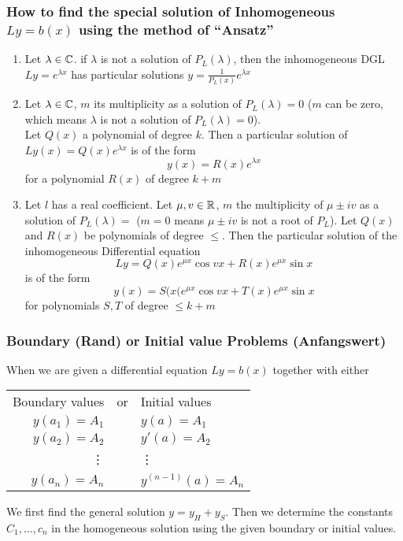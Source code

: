 \documentclass[a4paper]{article}
\begin{document}
\subsubsection*{How to find the special solution of Inhomogeneous $Ly=b(x)$ using the method of ``Ansatz''}
\begin{fact}{}
\begin{enumerate}
\item Let $\lambda\in\mathbb{C}$. if $\lambda$ is not a solution of $P_L(\lambda)$, then the inhomogeneous DGL $Ly=e^{\lambda x}$ has particular solutions $y=\frac{1}{P_L(x)}e^{\lambda x}$
\item Let $\lambda\in\mathbb{C}$, $m$ its multiplicity as a solution of $P_L(\lambda)=0$ ($m$ can be zero, which means $\lambda$ is not a solution of $P_L(\lambda)=0$).\\

Let $Q(x)$ a polynomial of degree $k$. Then a particular solution of $Ly(x)=Q(x)e^{\lambda x}$ is of the form \[y(x)=R(x)e^{\lambda x}\] for a polynomial $R(x)$ of degree $k+m$
\item Let $l$ has a real coefficient. Let $\mu,v\in\mathbb{R}$, $m$ the multiplicity of $\mu\pm iv$ as a solution of $P_L(\lambda)=$ ($m=0$ means $\mu \pm iv$ is not a root of $P_L$). Let $Q(x)$ and $R(x)$ be polynomials of degree $\leq$. Then the particular solution of the inhomogeneous Differential equation 
\[Ly=Q(x)e^{\mu x}\cos vx +R(x)e^{\mu x}\sin x\]
is of the form 
\[y(x)=S(x(e^{\mu x}\cos vx + T(x)e^{\mu x}\sin x\]
for polynomials $S,T$ of degree $\leq k+m$
\end{enumerate}
\end{fact}
\subsubsection*{Boundary (Rand) or Initial value Problems (Anfangswert)}
When we are given a differential equation $Ly=b(x)$ together with either 
\begin{center}
\begin{tabular}{r c l}
Boundary values & or & Initial values\\
$y(a_1)=A_1$ & {} & $y(a)=A_1$\\
$y(a_2)=A_2$ & {} & $y'(a)=A_2$\\
\vdots\hspace{7mm} & {} & \hspace{7mm}\vdots\\
$y(a_n)=A_n$ & {} & $y^{(n-1)}(a)=A_n$\\
\end{tabular}
\end{center}
We first find the general solution $y=y_H+y_S$. Then we determine the constants $C_1,\dots, c_n$ in the homogeneous solution using the given boundary or initial values.
\end{document}
